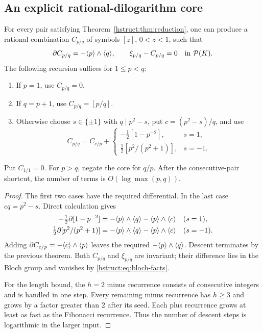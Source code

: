 \subsection{An explicit rational-dilogarithm core}

\begin{theorem}\label{hstruct:thm:core}
For every pair satisfying Theorem~\ref{hstruct:thm:reduction}, one can produce
a rational combination $C_{p/q}$ of symbols $[z]$, $0<z<1$, such that
\[
 \partial C_{p/q}=-\langle p\rangle\wedge\langle q\rangle,
 \qquad \xi_{p/q}-C_{p/q}=0\quad\hbox{in }\mathcal P(K).
\]
The following recursion suffices for $1\le p<q$:
\begin{enumerate}
\item If $p=1$, use $C_{p/q}=0$.
\item If $q=p+1$, use $C_{p/q}=[p/q]$.
\item Otherwise choose $s\in\{\pm1\}$ with $q\mid p^2-s$, put
      $c=(p^2-s)/q$, and use
\begin{equation}\label{hstruct:eq:core-recursion}
 C_{p/q}=C_{c/p}+
 \begin{cases}
 -\tfrac12[1-p^{-2}],&s=1,\\
 \tfrac12[p^2/(p^2+1)],&s=-1.
 \end{cases}
\end{equation}
\end{enumerate}
Put $C_{1/1}=0$. For $p>q$, negate the core for $q/p$.
After the consecutive-pair shortcut,
the number of terms is $O(\log\max(p,q))$.
\end{theorem}
\begin{proof}
The first two cases have the required differential. In the last case
$cq=p^2-s$. Direct calculation gives
\begin{align*}
 -\tfrac12\partial[1-p^{-2}]
   &=-\langle p\rangle\wedge\langle q\rangle-\langle p\rangle\wedge\langle c\rangle &&(s=1),\\
 \tfrac12\partial[p^2/(p^2+1)]
   &=-\langle p\rangle\wedge\langle q\rangle-\langle p\rangle\wedge\langle c\rangle &&(s=-1).
\end{align*}
Adding $\partial C_{c/p}=-\langle c\rangle\wedge\langle p\rangle$ leaves the required
$-\langle p\rangle\wedge\langle q\rangle$. Descent terminates by the previous theorem.
Both $C_{p/q}$ and $\xi_{p/q}$ are invariant; their difference lies in
the Bloch group and vanishes by \eqref{hstruct:eq:bloch-facts}.

For the length bound, the $h=2$ minus recurrence consists of consecutive
integers and is handled in one step. Every remaining minus recurrence
has $h\ge3$ and grows by a factor greater than $2$ after its seed.
Each plus recurrence grows at least as fast as the Fibonacci recurrence.
Thus the number of descent steps is logarithmic in the larger input.
\end{proof}

